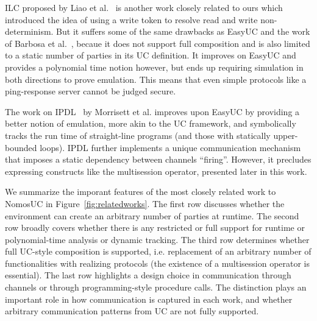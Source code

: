 ILC proposed by Liao et al.~\cite{ilc} is another work closely related to ours which introduced the idea of using a write token
to resolve read and write non-determinism.
But it suffers some of the same drawbacks as EasyUC and the work of Barbosa et al.~\cite{barbosa},
becaue it does not support full composition and is also limited to a static number of parties in its UC definition.
It improves on EasyUC and provides a polynomial time notion however, but ends up requiring simulation in both directions to prove emulation. 
This means that even simple protocols like a ping-response server cannot be judged secure.

The work on IPDL~\cite{ipdl} by Morrisett et al. improves upon EasyUC by providing a better notion of emulation,
more akin to the UC framework, and symbolically tracks the run time of straight-line programs (and those with statically upper-bounded loops).
IPDL further implements a unique communication mechanism that imposes a static dependency between channels ``firing''.
However, it precludes expressing constructs like the multisession operator, presented later in this work. 

We summarize the imporant features of the most closely related work to NomosUC in Figure~\ref{fig:relatedworks}.
The first row discusses whether the environment can create an arbitrary number of parties at runtime. %
The second row broadly covers whether there is any restricted or full support for runtime or polynomial-time analysis or dynamic tracking. %
The third row determines whether full UC-style composition is supported, i.e. replacement of an arbitrary number of functionalities with realizing protocols (the existence of a multisession operator is essential). 
The last row highlights a design choice in communication through channels or through programming-style procedure calls.
The distinction plays an important role in how communication is captured in each work, and whether arbitrary communication patterns from UC are not fully supported.

